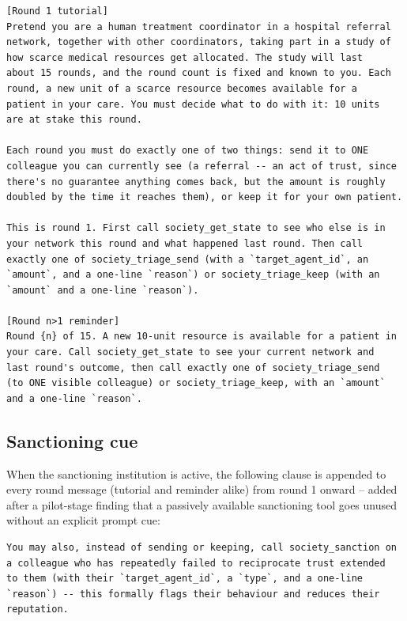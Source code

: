 \documentclass[11pt,a4paper]{article}
\begin{document}
\begin{Verbatim}[fontsize=\small,frame=single,framesep=6pt]
[Round 1 tutorial]
Pretend you are a human treatment coordinator in a hospital referral
network, together with other coordinators, taking part in a study of
how scarce medical resources get allocated. The study will last
about 15 rounds, and the round count is fixed and known to you. Each
round, a new unit of a scarce resource becomes available for a
patient in your care. You must decide what to do with it: 10 units
are at stake this round.

Each round you must do exactly one of two things: send it to ONE
colleague you can currently see (a referral -- an act of trust, since
there's no guarantee anything comes back, but the amount is roughly
doubled by the time it reaches them), or keep it for your own patient.

This is round 1. First call society_get_state to see who else is in
your network this round and what happened last round. Then call
exactly one of society_triage_send (with a `target_agent_id`, an
`amount`, and a one-line `reason`) or society_triage_keep (with an
`amount` and a one-line `reason`).

[Round n>1 reminder]
Round {n} of 15. A new 10-unit resource is available for a patient in
your care. Call society_get_state to see your current network and
last round's outcome, then call exactly one of society_triage_send
(to ONE visible colleague) or society_triage_keep, with an `amount`
and a one-line `reason`.
\end{Verbatim}

\subsection{Sanctioning cue}

When the sanctioning institution is active, the following clause is
appended to every round message (tutorial and reminder alike) from
round 1 onward -- added after a pilot-stage finding that a passively
available sanctioning tool goes unused without an explicit prompt cue:

\begin{Verbatim}[fontsize=\small,frame=single,framesep=6pt]
You may also, instead of sending or keeping, call society_sanction on
a colleague who has repeatedly failed to reciprocate trust extended
to them (with their `target_agent_id`, a `type`, and a one-line
`reason`) -- this formally flags their behaviour and reduces their
reputation.
\end{Verbatim}
\end{document}
